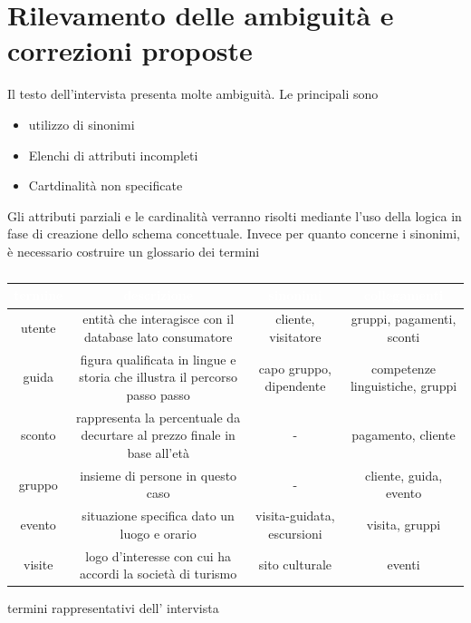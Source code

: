\documentclass[a4paper,12pt]{report}
\begin{document}
\section{Rilevamento delle ambiguità e correzioni proposte}
Il testo dell'intervista presenta molte ambiguità. Le principali sono
\begin{itemize}
	\item utilizzo di sinonimi
	\item Elenchi di attributi incompleti
	\item Cartdinalità non specificate
\end{itemize}

Gli attributi parziali e le cardinalità verranno risolti mediante l'uso della logica in fase di creazione dello schema concettuale.
Invece per quanto concerne i sinonimi, è necessario costruire un glossario dei termini


\begin{table}[H]
	\begin{center}
		\begin{tabularx}{\textwidth}{|C|C|C|C|}
			\hline
			 \textcolor{white}{termine} & \textcolor{white}{descrizione}                                             & \textcolor{white}{sinonimi} & \textcolor{white}{collegamenti} \\
			\hline
			utente                                    & entità che interagisce con il database lato consumatore                    & cliente, visitatore         & gruppi, pagamenti, sconti       \\
			\hline
			guida                                     & figura qualificata in lingue e storia che illustra il percorso passo passo & capo gruppo, dipendente     & competenze linguistiche, gruppi \\
			\hline
			sconto                                    & rappresenta la percentuale da decurtare al prezzo finale in base all'età   & -                           & pagamento, cliente              \\
			\hline
			gruppo                                    & insieme di persone in questo caso                                          & -                           & cliente, guida, evento          \\
			\hline
			evento                                    & situazione specifica dato un luogo e orario                                & visita-guidata, escursioni  & visita, gruppi                  \\
			\hline
			visite                                    & logo d'interesse con cui ha accordi la società di turismo                  & sito culturale              & eventi                          \\
			\hline
		\end{tabularx}
		\caption{\label{glossario:termini}} termini rappresentativi dell' intervista
	\end{center}
\end{table}
\end{document}
